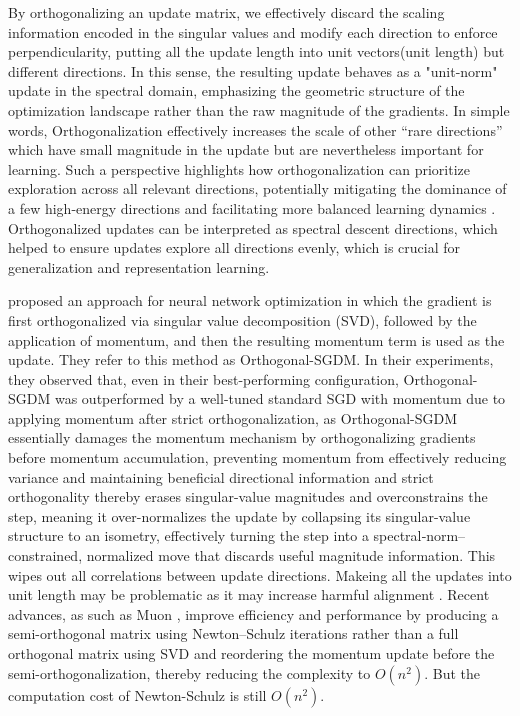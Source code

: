 \documentclass[12pt,a4paper]{article}
\begin{document}
By orthogonalizing an update matrix, we effectively discard the scaling information encoded in the singular values and modify each direction to enforce perpendicularity, putting all the  update length into unit vectors(unit length) but different directions. In this sense, the resulting update behaves as a  "unit-norm"  update in the spectral domain, emphasizing the geometric structure of the optimization landscape rather than the raw magnitude of the gradients. In simple words, Orthogonalization effectively increases the scale of other “rare directions” which have small magnitude in the update but are nevertheless important for learning. Such a perspective highlights how orthogonalization can prioritize exploration across all relevant directions, potentially mitigating the dominance of a few high-energy directions and facilitating more balanced learning dynamics \parencite{zhang2025adagradmeetsmuonadaptive}. Orthogonalized updates can be interpreted as spectral descent directions, which helped to ensure updates explore all directions evenly, which is crucial for generalization and representation learning.

\parencite{tuddenham2022orthogonalisinggradientsspeedneural} proposed an approach for neural network optimization in which the gradient is first orthogonalized via singular value decomposition (SVD), followed by the application of momentum, and then the resulting momentum term is used as the update. They refer to this method as Orthogonal-SGDM. In their experiments, they observed that, even in their best-performing configuration, Orthogonal-SGDM was outperformed by a well-tuned standard SGD with momentum due to applying momentum after strict orthogonalization, as Orthogonal-SGDM essentially damages the momentum mechanism by orthogonalizing gradients before momentum accumulation, preventing momentum from effectively reducing variance and maintaining beneficial directional information and strict orthogonality thereby erases singular-value magnitudes and overconstrains the step, meaning it over-normalizes the update by collapsing its singular-value structure to an isometry, effectively turning the step into a spectral‑norm–constrained, normalized move that discards useful magnitude information. This wipes out all correlations between update directions. Makeing all the updates into unit length may be problematic as it may increase harmful alignment  . Recent advances, as such as Muon \parencite{jordan2024muon}, improve efficiency and performance by producing a semi-orthogonal matrix using Newton–Schulz iterations rather than a full orthogonal matrix using SVD and reordering the momentum update before the semi-orthogonalization, thereby reducing the complexity to \(O(n^2)\). But the computation cost of Newton-Schulz is still \( O(n^2) \).
\end{document}
